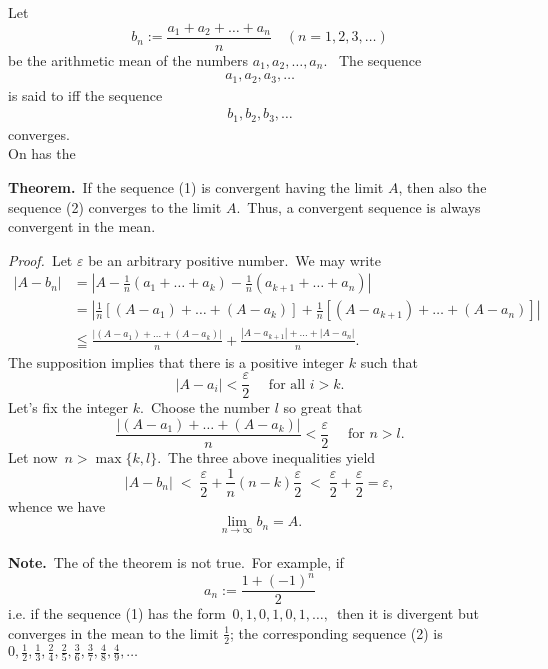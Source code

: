 \documentclass[12pt]{article}
\begin{document}
Let
$$b_n := \frac{a_1+a_2+\ldots+a_n}{n} \quad (n = 1,2,3,\ldots)$$
be the arithmetic mean of the numbers $a_1,a_2,\ldots,a_n$. \,
The sequence 
\begin{align}
a_1, a_2, a_3, \ldots
\end{align}
is said to  iff the 
sequence
\begin{align}
b_1,b_2,b_3,\ldots
\end{align}
converges.\\
On has the

\textbf{Theorem.}\, If the sequence (1) is convergent having the limit $A$, then also the sequence
(2) converges to the limit $A$.\, Thus, a convergent sequence is always convergent in the mean.

{\it Proof.}\, Let $\varepsilon$ be an arbitrary positive number.\, We may write
\begin{align*}
|A-b_n|  &= |A-\frac{1}{n}(a_1+\ldots+a_k)-\frac{1}{n}(a_{k+1}+\ldots+a_n)|\\ 
         &= |\frac{1}{n}[(A-a_1)+\ldots+(A-a_k)]+\frac{1}{n}[(A-a_{k+1})+\ldots+(A-a_n)]|\\
         &\leqq \frac{|(A-a_1)+\ldots+(A-a_k)|}{n}+\frac{|A-a_{k+1}|+\ldots+|A-a_n|}{n}.
\end{align*}
The supposition implies that there is a positive integer $k$ such that 
$$|A-a_i| < \frac{\varepsilon}{2} \quad\mbox{ for all  } i > k.$$
Let's fix the integer $k$.\, Choose the number 
$l$ so great that
$$\frac{|(A-a_1)+\ldots+(A-a_k)|}{n} < \frac{\varepsilon}{2}
 \quad\mbox{ for   } n > l.$$
Let now\, $n > \max\{k,l\}$.\, The three above inequalities yield
$$|A-b_n| \;<\; \frac{\varepsilon}{2}+\frac{1}{n}\!(n-k)\!\!\frac{\varepsilon}{2} \;<\;
\frac{\varepsilon}{2}+\frac{\varepsilon}{2} = \varepsilon,$$
whence we have\, 
$$\lim_{n\to\infty}b_n = A.$$\\

\textbf{Note.}\, The  of the theorem is not 
true.\, For example, if 
$$a_n := \frac{1+(-1)^n}{2}$$
i.e. if the sequence (1) has the form\, $0,1,0,1,0,1,\ldots,$\,
then it is divergent but converges in the mean to the limit 
$\frac{1}{2}$; the corresponding sequence (2) is
$0,\frac{1}{2},\frac{1}{3},\frac{2}{4},\frac{2}{5},
\frac{3}{6},\frac{3}{7},\frac{4}{8},\frac{4}{9},\ldots$\\
\end{document}
